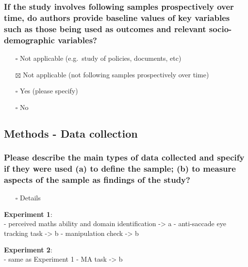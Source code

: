 \documentclass[
  doc, a4paper]{apa7}
\providecommand{\tightlist}{%
  \setlength{\itemsep}{0pt}\setlength{\parskip}{0pt}}
\begin{document}
\subsubsection{If the study involves following samples prospectively over time, do authors provide baseline values of key variables such as those being used as outcomes and relevant socio-demographic variables?}\label{if-the-study-involves-following-samples-prospectively-over-time-do-authors-provide-baseline-values-of-key-variables-such-as-those-being-used-as-outcomes-and-relevant-socio-demographic-variables}

\begin{itemize}
\tightlist
\item[$\square$]
  Not applicable (e.g.~study of policies, documents, etc)
\item[$\boxtimes$]
  Not applicable (not following samples prospectively over time)
\item[$\square$]
  Yes (please specify)
\item[$\square$]
  No
\end{itemize}

\subsection{Methods - Data collection}\label{methods---data-collection}

\subsubsection{Please describe the main types of data collected and specify if they were used (a) to define the sample; (b) to measure aspects of the sample as findings of the study?}\label{please-describe-the-main-types-of-data-collected-and-specify-if-they-were-used-a-to-define-the-sample-b-to-measure-aspects-of-the-sample-as-findings-of-the-study}

\begin{itemize}
\tightlist
\item[$\square$]
  Details
\end{itemize}

\textbf{Experiment 1}:\\
- perceived maths ability and domain identification -\textgreater{} a
- anti-saccade eye tracking task -\textgreater{} b
- manipulation check -\textgreater{} b

\textbf{Experiment 2}:\\
- same as Experiment 1
- MA task -\textgreater{} b
\end{document}
